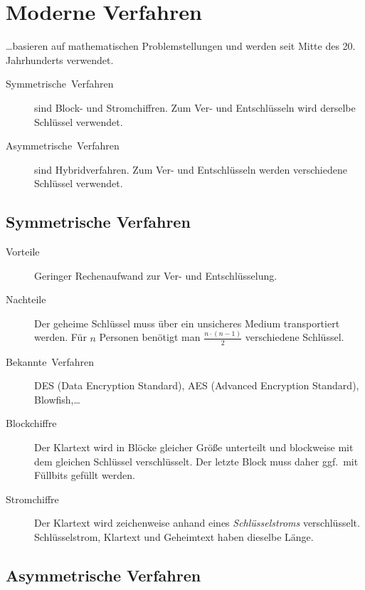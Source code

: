 \section{Moderne Verfahren}

\ldots{}basieren auf mathematischen Problemstellungen und werden seit Mitte des 20. Jahrhunderts verwendet.
\begin{description}
  \item [{Symmetrische~Verfahren}] 
	sind Block- und Stromchiffren.
	Zum Ver- und Entschlüsseln wird derselbe Schlüssel verwendet.
  \item [{Asymmetrische~Verfahren}] 
	sind Hybridverfahren.
	Zum Ver- und Entschlüsseln werden verschiedene Schlüssel verwendet.
\end{description}

\subsection{Symmetrische Verfahren}
\begin{description}
  \item [{Vorteile}] 
	Geringer Rechenaufwand zur Ver- und Entschlüsselung.
  \item [{Nachteile}]
	Der geheime Schlüssel muss über ein unsicheres Medium transportiert werden.
	Für $n$ Personen benötigt man $\frac{n\cdot(n-1)}{2}$ verschiedene Schlüssel.
  \item [{Bekannte~Verfahren}] 
    DES (\foreignlanguage{english}{Data Encryption Standard}), AES (\foreignlanguage{english}{Advanced Encryption Standard}), Blowfish,\ldots{}
  \item [{Blockchiffre}] 
	Der Klartext wird in Blöcke gleicher Größe unterteilt und blockweise mit dem gleichen Schlüssel verschlüsselt.
	Der letzte Block muss daher ggf.~mit Füllbits gefüllt werden.
  \item [{Stromchiffre}] 
	Der Klartext wird zeichenweise anhand eines \emph{Schlüsselstroms} verschlüsselt.
	Schlüsselstrom, Klartext und Geheimtext haben dieselbe Länge.
\end{description}

\subsection{Asymmetrische Verfahren}


